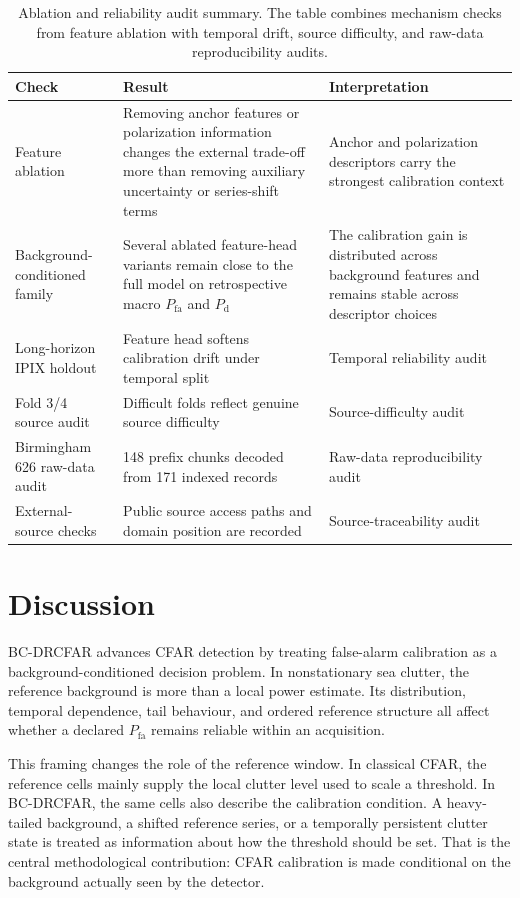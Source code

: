 \documentclass[preprint,12pt]{elsarticle}
\begin{document}
\begin{table}[!htbp]
\centering
\small
\caption{Ablation and reliability audit summary. The table combines mechanism
checks from feature ablation with temporal drift, source difficulty, and
raw-data reproducibility audits.}
\label{tab:boundary}
\begin{tabularx}{\textwidth}{lXX}
\toprule
Check & Result & Interpretation \\
\midrule
Feature ablation & Removing anchor features or polarization information changes
the external trade-off more than removing auxiliary uncertainty or series-shift
terms & Anchor and polarization descriptors carry the strongest calibration
context \\
Background-conditioned family & Several ablated feature-head variants remain
close to the full model on retrospective macro $P_{\mathrm{fa}}$ and
$P_{\mathrm{d}}$ & The calibration gain is distributed across background
features and remains stable across descriptor choices \\
Long-horizon IPIX holdout & Feature head softens calibration drift under
temporal split & Temporal reliability audit \\
Fold 3/4 source audit & Difficult folds reflect genuine source difficulty &
Source-difficulty audit \\
Birmingham 626 raw-data audit & 148 prefix chunks decoded from 171 indexed
records & Raw-data reproducibility audit \\
External-source checks & Public source access paths and domain position are
recorded & Source-traceability audit \\
\bottomrule
\end{tabularx}
\end{table}
\FloatBarrier

\section{Discussion}
\label{sec:discussion}

BC-DRCFAR advances CFAR detection by treating false-alarm calibration as a
background-conditioned decision problem. In nonstationary sea clutter, the
reference background is more than a local power estimate. Its distribution,
temporal dependence, tail behaviour, and ordered reference structure all affect
whether a declared $P_{\mathrm{fa}}$ remains reliable within an acquisition.

This framing changes the role of the reference window. In classical CFAR, the
reference cells mainly supply the local clutter level used to scale a threshold.
In BC-DRCFAR, the same cells also describe the calibration condition. A
heavy-tailed background, a shifted reference series, or a temporally persistent
clutter state is treated as information about how the threshold should be set.
That is the central methodological contribution: CFAR calibration is made
conditional on the background actually seen by the detector.
\end{document}
